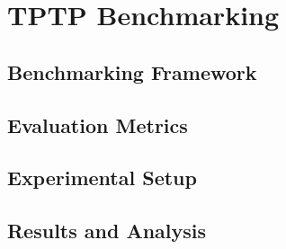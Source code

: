 \chapter{TPTP Benchmarking}\label{chap:tptp-benchmarking}
\section{Benchmarking Framework}
\section{Evaluation Metrics}
\section{Experimental Setup}
\section{Results and Analysis}


